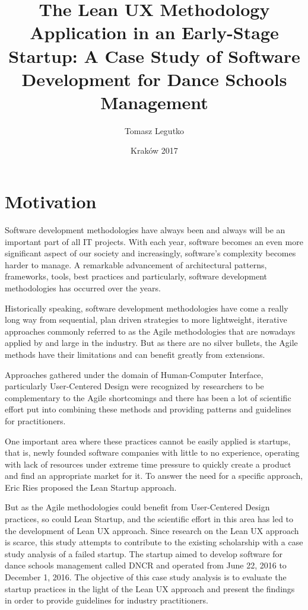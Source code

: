 \documentclass{article}
\title{The Lean UX Methodology Application in an Early-Stage Startup: A Case Study of Software Development for Dance Schools Management}
\author{Tomasz Legutko}
\date{Kraków 2017}
\begin{document}

\tableofcontents

\section{Motivation}
Software development methodologies have always been and always will be an important part of all IT projects. With each year, software becomes an even more significant aspect of our society and increasingly, software's complexity becomes harder to manage. A remarkable advancement of architectural patterns, frameworks, tools, best practices and particularly, software development methodologies has occurred over the years.

Historically speaking, software development methodologies have come a really long way from sequential, plan driven strategies to more lightweight, iterative approaches commonly referred to as the Agile methodologies that are nowadays applied by and large in the industry. But as there are no silver bullets, the Agile methods have their limitations and can benefit greatly from extensions.
 
Approaches gathered under the domain of Human-Computer Interface, particularly User-Centered Design were recognized by researchers to be complementary to the Agile shortcomings and there has been a lot of scientific effort put into combining these methods and providing patterns and guidelines for practitioners. 

One important area where these practices cannot be easily applied is startups, that is, newly founded software companies with little to no experience, operating with lack of resources under extreme time pressure to quickly create a product and find an appropriate market for it. To answer the need for a specific approach, Eric Ries proposed the Lean Startup approach.

But as the Agile methodologies could benefit from User-Centered Design practices, so could Lean Startup, and the scientific effort in this area has led to the development of Lean UX approach. Since research on the Lean UX approach is scarce, this study attempts to contribute to the existing scholarship with a case study analysis of a failed startup. The startup aimed to develop software for dance schools management called DNCR and operated from June 22, 2016 to December 1, 2016. The objective of this case study analysis is to evaluate the startup practices in the light of the Lean UX approach and present the findings in order to provide guidelines for industry practitioners.
\end{document}
